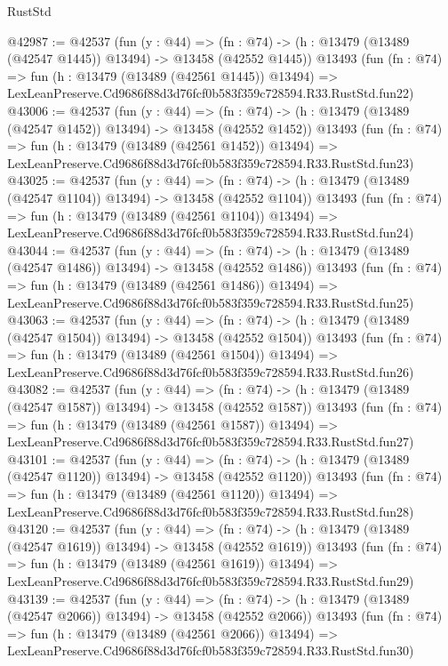 \begin{lexlean}{RustStd}
\begin{coremodule}
@42987 := @42537
    (fun (y : @44) =>
    (fn : @74) -> (h : @13479 (@13489 (@42547 @1445)) @13494) -> @13458 (@42552 @1445))
    @13493
    (fun (fn : @74) =>
    fun (h : @13479 (@13489 (@42561 @1445)) @13494) =>
    LexLeanPreserve.Cd9686f88d3d76fcf0b583f359c728594.R33.RustStd.fun22)
@43006 := @42537
    (fun (y : @44) =>
    (fn : @74) -> (h : @13479 (@13489 (@42547 @1452)) @13494) -> @13458 (@42552 @1452))
    @13493
    (fun (fn : @74) =>
    fun (h : @13479 (@13489 (@42561 @1452)) @13494) =>
    LexLeanPreserve.Cd9686f88d3d76fcf0b583f359c728594.R33.RustStd.fun23)
@43025 := @42537
    (fun (y : @44) =>
    (fn : @74) -> (h : @13479 (@13489 (@42547 @1104)) @13494) -> @13458 (@42552 @1104))
    @13493
    (fun (fn : @74) =>
    fun (h : @13479 (@13489 (@42561 @1104)) @13494) =>
    LexLeanPreserve.Cd9686f88d3d76fcf0b583f359c728594.R33.RustStd.fun24)
@43044 := @42537
    (fun (y : @44) =>
    (fn : @74) -> (h : @13479 (@13489 (@42547 @1486)) @13494) -> @13458 (@42552 @1486))
    @13493
    (fun (fn : @74) =>
    fun (h : @13479 (@13489 (@42561 @1486)) @13494) =>
    LexLeanPreserve.Cd9686f88d3d76fcf0b583f359c728594.R33.RustStd.fun25)
@43063 := @42537
    (fun (y : @44) =>
    (fn : @74) -> (h : @13479 (@13489 (@42547 @1504)) @13494) -> @13458 (@42552 @1504))
    @13493
    (fun (fn : @74) =>
    fun (h : @13479 (@13489 (@42561 @1504)) @13494) =>
    LexLeanPreserve.Cd9686f88d3d76fcf0b583f359c728594.R33.RustStd.fun26)
@43082 := @42537
    (fun (y : @44) =>
    (fn : @74) -> (h : @13479 (@13489 (@42547 @1587)) @13494) -> @13458 (@42552 @1587))
    @13493
    (fun (fn : @74) =>
    fun (h : @13479 (@13489 (@42561 @1587)) @13494) =>
    LexLeanPreserve.Cd9686f88d3d76fcf0b583f359c728594.R33.RustStd.fun27)
@43101 := @42537
    (fun (y : @44) =>
    (fn : @74) -> (h : @13479 (@13489 (@42547 @1120)) @13494) -> @13458 (@42552 @1120))
    @13493
    (fun (fn : @74) =>
    fun (h : @13479 (@13489 (@42561 @1120)) @13494) =>
    LexLeanPreserve.Cd9686f88d3d76fcf0b583f359c728594.R33.RustStd.fun28)
@43120 := @42537
    (fun (y : @44) =>
    (fn : @74) -> (h : @13479 (@13489 (@42547 @1619)) @13494) -> @13458 (@42552 @1619))
    @13493
    (fun (fn : @74) =>
    fun (h : @13479 (@13489 (@42561 @1619)) @13494) =>
    LexLeanPreserve.Cd9686f88d3d76fcf0b583f359c728594.R33.RustStd.fun29)
@43139 := @42537
    (fun (y : @44) =>
    (fn : @74) -> (h : @13479 (@13489 (@42547 @2066)) @13494) -> @13458 (@42552 @2066))
    @13493
    (fun (fn : @74) =>
    fun (h : @13479 (@13489 (@42561 @2066)) @13494) =>
    LexLeanPreserve.Cd9686f88d3d76fcf0b583f359c728594.R33.RustStd.fun30)

\end{coremodule}
\end{lexlean}
